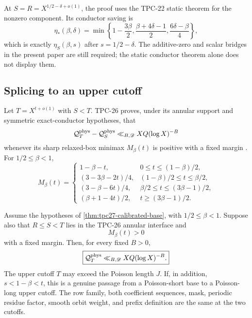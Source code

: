 \begin{remark}
\label{rem:tpc27-static-base}
At \(S=R=X^{1/2-\delta+o(1)}\), the proof uses the TPC-22 static
theorem for the nonzero component.  Its conductor saving is
\[
 \eta_*(\beta,\delta)=
 \min\left\{
 1-\frac{3\beta}{2},
 \frac{\beta+4\delta-1}{2},
 \frac{6\delta-\beta}{4}
 \right\},
\]
which is exactly \(\eta_S(\beta,s)\) after
\(s=1/2-\delta\).  The additive-zero and scalar bridges in the present
paper are still required; the static conductor theorem alone does not
display them.
\end{remark}

\subsection{Splicing to an upper cutoff}

Let \(T=X^{t+o(1)}\) with \(S<T\).  TPC-26 proves, under its annular
support and symmetric exact-conductor hypotheses, that
\begin{equation}
 \mathcal Q_T^{\rm phys}-\mathcal Q_S^{\rm phys}
 \ll_{B,\mathscr D}XQ(\log X)^{-B}
 \label{eq:tpc27-imported-annular-stability}
\end{equation}
whenever its sharp relaxed-box minimax \(M_\beta(t)\) is positive with
a fixed margin \citep{WangTPC26}.  For \(1/2\le\beta<1\),
\begin{equation}
 M_\beta(t)=
 \begin{cases}
 1-\beta-t,
 &0\le t\le(1-\beta)/2,\\[2pt]
 (3-3\beta-2t)/4,
 &(1-\beta)/2\le t\le\beta/2,\\[2pt]
 (3-\beta-6t)/4,
 &\beta/2\le t\le(3\beta-1)/2,\\[2pt]
 (\beta+1-4t)/2,
 &t\ge(3\beta-1)/2.
 \end{cases}
 \label{eq:tpc27-Mbeta}
\end{equation}

\begin{corollary}
\label{cor:tpc27-selected-passage}
Assume the hypotheses of \cref{thm:tpc27-calibrated-base}, with
\(1/2\le\beta<1\).  Suppose also that \(R\le S<T\) lies in the
TPC-26 annular interface and
\begin{equation}
 M_\beta(t)>0
 \label{eq:tpc27-annular-positive}
\end{equation}
with a fixed margin.  Then, for every fixed \(B>0\),
\begin{equation}
 \boxed{
 \mathcal Q_T^{\rm phys}
 \ll_{B,\mathscr D}XQ(\log X)^{-B}.}
 \label{eq:tpc27-upper-closure}
\end{equation}
The upper cutoff \(T\) may exceed the Poisson length \(J\).
If, in addition, \(s<1-\beta<t\), this is a genuine passage from a
Poisson-short base to a Poisson-long upper cutoff.
The row family, both coefficient sequences, mask, periodic residue
factor, smooth orbit weight, and prefix definition are the same at
the two cutoffs.
\end{corollary}

